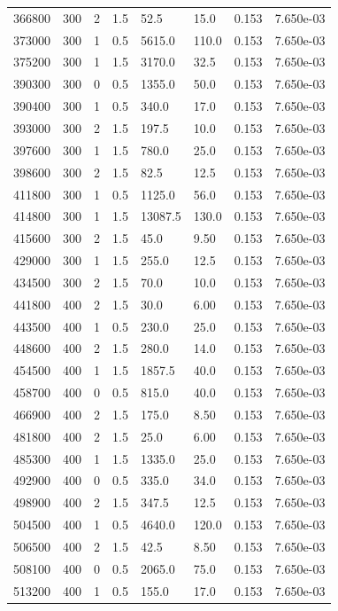 \documentclass[preview]{standalone}
\begin{document}
{{{\begin{tabular}{L{1.2cm}C{1.2cm} C{0.3cm}C{0.5cm} C{1.4cm}C{1.4cm} C{1.4cm}C{1.4cm}}
  366800  &   300  & 2     & 1.5 &  52.5  & 15.0  & 0.153 &  7.650e-03   \\ 
  373000  &   300  & 1     & 0.5 &  5615.0  & 110.0  & 0.153 &  7.650e-03   \\ 
  375200  &   300  & 1     & 1.5 &  3170.0  & 32.5  & 0.153 &  7.650e-03   \\ 
  390300  &   300  & 0     & 0.5 &  1355.0  & 50.0  & 0.153 &  7.650e-03   \\ 
  390400  &   300  & 1     & 0.5 &  340.0  & 17.0  & 0.153 &  7.650e-03   \\ 
  393000  &   300  & 2     & 1.5 &  197.5  & 10.0  & 0.153 &  7.650e-03   \\ 
  397600  &   300  & 1     & 1.5 &  780.0  & 25.0  & 0.153 &  7.650e-03   \\ 
  398600  &   300  & 2     & 1.5 &  82.5  & 12.5  & 0.153 &  7.650e-03   \\ 
  411800  &   300  & 1     & 0.5 &  1125.0  & 56.0  & 0.153 &  7.650e-03   \\ 
  414800  &   300  & 1     & 1.5 &  13087.5  & 130.0  & 0.153 &  7.650e-03   \\ 
  415600  &   300  & 2     & 1.5 &  45.0  & 9.50  & 0.153 &  7.650e-03   \\ 
  429000  &   300  & 1     & 1.5 &  255.0  & 12.5  & 0.153 &  7.650e-03   \\ 
  434500  &   300  & 2     & 1.5 &  70.0  & 10.0  & 0.153 &  7.650e-03   \\ 
  441800  &   400  & 2     & 1.5 &  30.0  & 6.00  & 0.153 &  7.650e-03   \\ 
  443500  &   400  & 1     & 0.5 &  230.0  & 25.0  & 0.153 &  7.650e-03   \\ 
  448600  &   400  & 2     & 1.5 &  280.0  & 14.0  & 0.153 &  7.650e-03   \\ 
  454500  &   400  & 1     & 1.5 &  1857.5  & 40.0  & 0.153 &  7.650e-03   \\ 
  458700  &   400  & 0     & 0.5 &  815.0  & 40.0  & 0.153 &  7.650e-03   \\ 
  466900  &   400  & 2     & 1.5 &  175.0  & 8.50  & 0.153 &  7.650e-03   \\ 
  481800  &   400  & 2     & 1.5 &  25.0  & 6.00  & 0.153 &  7.650e-03   \\ 
  485300  &   400  & 1     & 1.5 &  1335.0  & 25.0  & 0.153 &  7.650e-03   \\ 
  492900  &   400  & 0     & 0.5 &  335.0  & 34.0  & 0.153 &  7.650e-03   \\ 
  498900  &   400  & 2     & 1.5 &  347.5  & 12.5  & 0.153 &  7.650e-03   \\ 
  504500  &   400  & 1     & 0.5 &  4640.0  & 120.0  & 0.153 &  7.650e-03   \\ 
  506500  &   400  & 2     & 1.5 &  42.5  & 8.50  & 0.153 &  7.650e-03   \\ 
  508100  &   400  & 0     & 0.5 &  2065.0  & 75.0  & 0.153 &  7.650e-03   \\ 
  513200  &   400  & 1     & 0.5 &  155.0  & 17.0  & 0.153 &  7.650e-03   \\ 
\hline 
\end{tabular} 

}}}
\end{document}
